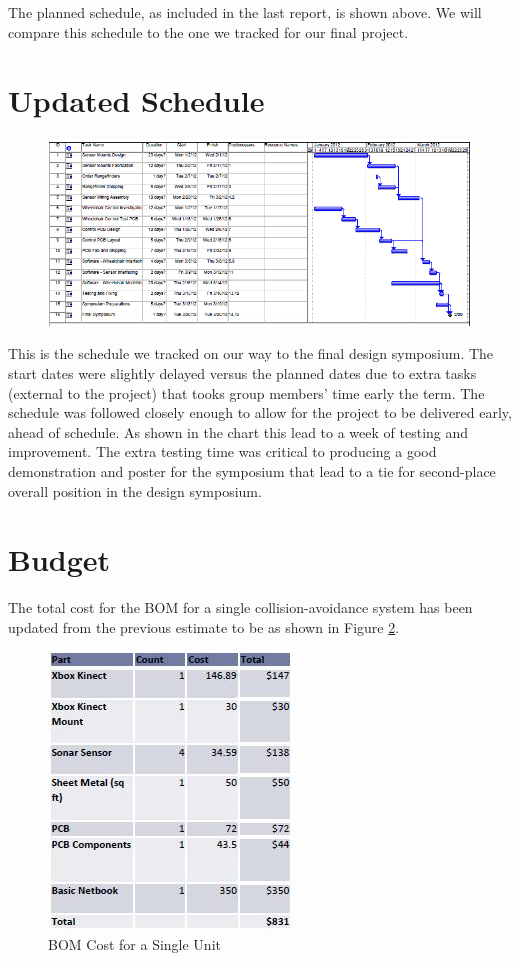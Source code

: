 \documentclass[oneside,final,a4paper]{report}
\begin{document}
The planned schedule, as included in the last report, is shown above. We will compare this schedule to the one we tracked for our final project.

\section{Updated Schedule}
\begin{figure}
 \centering
 \includegraphics[scale=0.55]{Final_Schedule} \label{fig:final_schel}
\end{figure}

This is the schedule we tracked on our way to the final design symposium. The start dates were slightly delayed versus the planned dates due to extra tasks (external to the project) that tooks group members' time early the term. The schedule was followed closely enough to allow for the project to be delivered early, ahead of schedule. As shown in the chart this lead to a week of testing and improvement. The extra testing time was critical to producing a good demonstration and poster for the symposium that lead to a tie for second-place overall position in the design symposium.

\section{Budget}
The total cost for the BOM for a single collision-avoidance system has been updated from the previous estimate to be as shown in Figure \ref{fig:BOM_single}.

\begin{figure}[hbt]
 \centering
 \includegraphics[scale=1]{BOM_single}
 \caption{BOM Cost for a Single Unit}
 \label{fig:BOM_single}
\end{figure}
\end{document}

